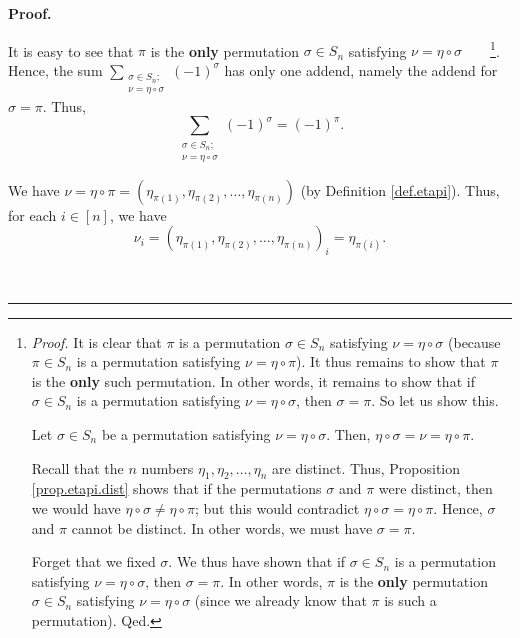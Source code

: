 \documentclass[numbers=enddot,12pt,final,onecolumn,notitlepage,english]{scrartcl}%
\theoremstyle{definition}
\newenvironment{proof}[1][Proof]{\noindent\textbf{#1.} }{\ \rule{0.5em}{0.5em}}
\let\sumnonlimits\sum
\renewcommand{\sum}{\sumnonlimits\limits}
\newenvironment{verlong}{}{}
\newenvironment{vershort}{}{}
\begin{document}
\begin{proof}
\begin{vershort}
\end{vershort}

\begin{verlong}
It is easy to see that $\pi$ is the \textbf{only} permutation $\sigma\in
S_{n}$ satisfying $\nu=\eta\circ\sigma$\ \ \ \ \footnote{\textit{Proof.} It is
clear that $\pi$ is a permutation $\sigma\in S_{n}$ satisfying $\nu=\eta
\circ\sigma$ (because $\pi\in S_{n}$ is a permutation satisfying $\nu
=\eta\circ\pi$). It thus remains to show that $\pi$ is the \textbf{only} such
permutation. In other words, it remains to show that if $\sigma\in S_{n}$ is a
permutation satisfying $\nu=\eta\circ\sigma$, then $\sigma=\pi$. So let us
show this.
\par
Let $\sigma\in S_{n}$ be a permutation satisfying $\nu=\eta\circ\sigma$. Then,
$\eta\circ\sigma=\nu=\eta\circ\pi$.
\par
Recall that the $n$ numbers $\eta_{1},\eta_{2},\ldots,\eta_{n}$ are distinct.
Thus, Proposition \ref{prop.etapi.dist} shows that if the permutations
$\sigma$ and $\pi$ were distinct, then we would have $\eta\circ\sigma\neq
\eta\circ\pi$; but this would contradict $\eta\circ\sigma=\eta\circ\pi$.
Hence, $\sigma$ and $\pi$ cannot be distinct. In other words, we must have
$\sigma=\pi$.
\par
Forget that we fixed $\sigma$. We thus have shown that if $\sigma\in S_{n}$ is
a permutation satisfying $\nu=\eta\circ\sigma$, then $\sigma=\pi$. In other
words, $\pi$ is the \textbf{only} permutation $\sigma\in S_{n}$ satisfying
$\nu=\eta\circ\sigma$ (since we already know that $\pi$ is such a
permutation). Qed.}. Hence, the sum $\sum_{\substack{\sigma\in S_{n}%
;\\\nu=\eta\circ\sigma}}\left(  -1\right)  ^{\sigma}$ has only one addend,
namely the addend for $\sigma=\pi$. Thus,
\begin{equation}
\sum_{\substack{\sigma\in S_{n};\\\nu=\eta\circ\sigma}}\left(  -1\right)
^{\sigma}=\left(  -1\right)  ^{\pi}. \label{pf.lem.nu-det.c2.sum=}%
\end{equation}

\end{verlong}

We have $\nu=\eta\circ\pi=\left(  \eta_{\pi\left(  1\right)  },\eta
_{\pi\left(  2\right)  },\ldots,\eta_{\pi\left(  n\right)  }\right)  $ (by
Definition \ref{def.etapi}). Thus, for each $i\in\left[  n\right]  $, we have
\begin{equation}
\nu_{i}=\left(  \eta_{\pi\left(  1\right)  },\eta_{\pi\left(  2\right)
},\ldots,\eta_{\pi\left(  n\right)  }\right)  _{i}=\eta_{\pi\left(  i\right)
}. \label{pf.lem.nu-det.c2.nui=}%
\end{equation}



\end{proof}
\end{document}
